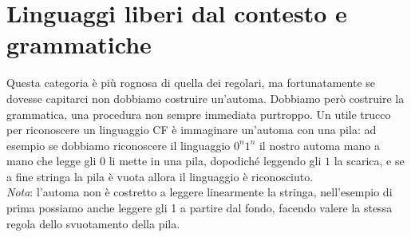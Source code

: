 \documentclass[a4paper,oneside]{scrbook}
\begin{document}
\chapter{Linguaggi liberi dal contesto e grammatiche}
Questa categoria è più rognosa di quella dei regolari, ma fortunatamente se dovesse capitarci non dobbiamo costruire un'automa. Dobbiamo però costruire la grammatica,
una procedura non sempre immediata purtroppo. Un utile trucco per riconoscere un linguaggio CF è immaginare un'automa con una pila: ad esempio se dobbiamo riconoscere il linguaggio
$0^n1^n$ il nostro automa mano a mano che legge gli $0$ li mette in una pila, dopodiché leggendo gli $1$ la scarica, e se a fine stringa la pila è vuota allora il linguaggio è riconosciuto.\\
\textit{Nota}: l'automa non è costretto a leggere linearmente la stringa, nell'esempio di prima possiamo anche leggere gli 1 a partire dal fondo, facendo valere la stessa regola dello
svuotamento della pila.
\end{document}
